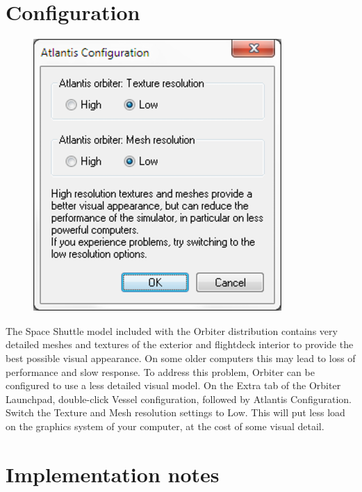 \section{Configuration}
\begin{figure}
\includegraphics[width=\linewidth]{Images//Pic10.png}
\caption{}
\end{figure}
The Space Shuttle model included with the Orbiter distribution contains very detailed meshes and textures of the exterior and flightdeck interior to provide the best possible visual appearance. On some older computers this may lead to loss of performance and slow response. To address this problem, Orbiter can be configured to use a less detailed visual model.
On the Extra tab of the Orbiter Launchpad, double-click Vessel configuration, followed by Atlantis Configuration. Switch the Texture and Mesh resolution settings to Low. This will put less load on the graphics system of your computer, at the cost of some visual detail.

\section{Implementation notes}


